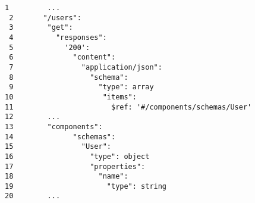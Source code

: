 \begin{figure}
    \centering
        \begin{lstlisting}[style=htmlcssjs, label=lst:improving_scan_working_oas_example, caption=Snippet of an OpenAPI document in YAML defining a service that maps to SCAN ,captionpos=b]
 1         ...
 2       "/users":
 3        "get":
 4          "responses":
 5            '200':
 6              "content":
 7                "application/json":
 8                  "schema":
 9                    "type": array
10                     "items": 
11                       $ref: '#/components/schemas/User'
12        ...
13        "components":
14              "schemas":
15                "User":
16                  "type": object
17                  "properties":
18                    "name":
19                      "type": string
20        ...          
        \end{lstlisting}
\end{figure}